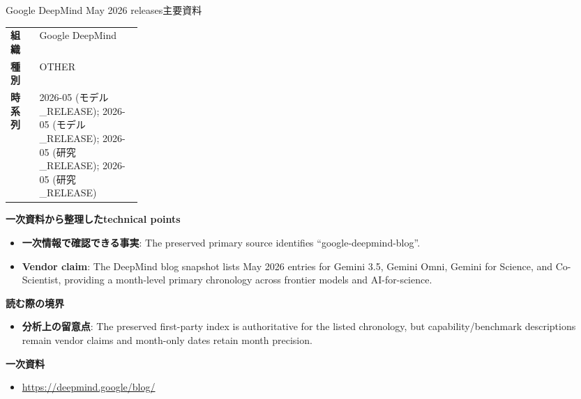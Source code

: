 \begin{technicalnote}{Google DeepMind May 2026 releases}{主要資料}
\begin{tabularx}{\linewidth}{@{}>{\bfseries}p{0.22\linewidth}X@{}}
組織 & Google DeepMind \\
種別 & OTHER \\
時系列 & 2026-05 (モデル\_RELEASE); 2026-05 (モデル\_RELEASE); 2026-05 (研究\_RELEASE); 2026-05 (研究\_RELEASE) \\
\end{tabularx}
\smallskip
{\bfseries 一次資料から整理したtechnical points}
\begin{itemize}[leftmargin=1.5em,itemsep=0.35em]
\item \textbf{一次情報で確認できる事実}: The preserved primary source identifies “google-deepmind-blog”.
\item \textbf{Vendor claim}: The DeepMind blog snapshot lists May 2026 entries for Gemini 3.5, Gemini Omni, Gemini for Science, and Co-Scientist, providing a month-level primary chronology across frontier models and AI-for-science.
\end{itemize}
{\bfseries 読む際の境界}
\begin{itemize}[leftmargin=1.5em,itemsep=0.35em]
\item \textbf{分析上の留意点}: The preserved first-party index is authoritative for the listed chronology, but capability/benchmark descriptions remain vendor claims and month-only dates retain month precision.
\end{itemize}
{\bfseries 一次資料}
\begingroup\sloppy
\begin{itemize}[leftmargin=1.5em,itemsep=0.25em]
\item {\scriptsize\url{https://deepmind.google/blog/}}
\end{itemize}
\endgroup
\end{technicalnote}
\medskip

